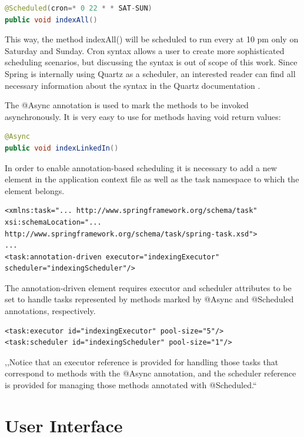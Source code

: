 \documentclass[12pt, oneside, a4paper]{book}
\begin{document}
\begin{lstlisting}[language=Java]
@Scheduled(cron=* 0 22 * * SAT-SUN)
public void indexAll()
\end{lstlisting}


This way, the method indexAll() will be scheduled to run every at 10 pm only on Saturday and Sunday. 
Cron syntax allows a user to create more sophisticated scheduling scenarios, but discussing the syntax is out of scope of this work. 
Since Spring is internally using Quartz as a scheduler, an interested reader can find all necessary information about the syntax in the Quartz documentation \cite{QuartzDoc}.

The @Async annotation is used to mark the methods to be invoked asynchronously.
It is very easy to use for methods having void return values:

\begin{lstlisting}[language=Java]
@Async
public void indexLinkedIn()
\end{lstlisting}


In order to enable annotation-based scheduling it is necessary to
add a new element in the application context file as well as the task
namespace to which the element belongs.

\begin{lstlisting}
<xmlns:task="... http://www.springframework.org/schema/task" 
xsi:schemaLocation="... http://www.springframework.org/schema/task/spring-task.xsd">
...
<task:annotation-driven executor="indexingExecutor" scheduler="indexingScheduler"/>
\end{lstlisting}


The annotation-driven element requires executor and scheduler attributes
to be set to handle tasks represented by methods marked by @Async
and @Scheduled annotations, respectively.

\begin{lstlisting}
<task:executor id="indexingExecutor" pool-size="5"/> 
<task:scheduler id="indexingScheduler" pool-size="1"/>
\end{lstlisting}




,,Notice that an executor reference is provided for handling those
tasks that correspond to methods with the @Async annotation, and the
scheduler reference is provided for managing those methods annotated
with @Scheduled.``


\section{User Interface}
\end{document}
